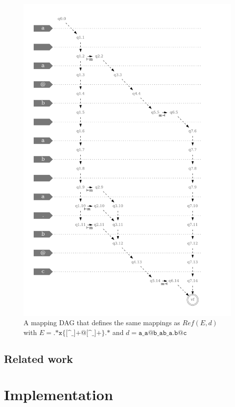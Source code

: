 \documentclass[12px]{article}
\theoremstyle{definition}
\begin{document}
        \begin{figure}
          \caption{%
            A mapping DAG that defines the same mappings as $Ref(E, d)$ with $E
            = \texttt{.*x\{[\textasciicircum\_]+@[\textasciicircum\_]+\}.*}$
            and $d = \texttt{a\_a@b\_ab\_a.b@c}$
          }
          \center\includegraphics[width=5in]{figures/example_dag}
        \end{figure}

    \subsection{Related work}


  \section{Implementation}
\end{document}
